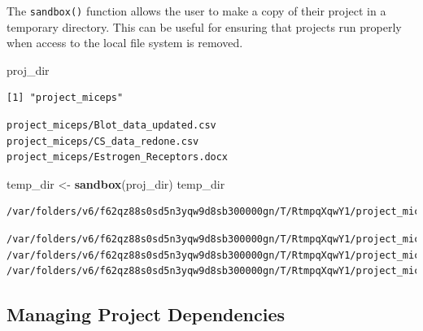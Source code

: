 \documentclass[12pt,twoside]{reedthesis}
\newenvironment{Shaded}{\begin{snugshade}}{\end{snugshade}}
\newcommand{\KeywordTok}[1]{\textcolor[rgb]{0.13,0.29,0.53}{\textbf{#1}}}
\newcommand{\DecValTok}[1]{\textcolor[rgb]{0.00,0.00,0.81}{#1}}
\newcommand{\StringTok}[1]{\textcolor[rgb]{0.31,0.60,0.02}{#1}}
\newcommand{\OperatorTok}[1]{\textcolor[rgb]{0.81,0.36,0.00}{\textbf{#1}}}
\newcommand{\NormalTok}[1]{#1}
\begin{document}
The \texttt{sandbox()} function allows the user to make a copy of their
project in a temporary directory. This can be useful for ensuring that
projects run properly when access to the local file system is removed.
\begin{Shaded}
\begin{Highlighting}[]
\NormalTok{proj_dir}
\end{Highlighting}
\end{Shaded}
\begin{verbatim}
[1] "project_miceps"
\end{verbatim}
\begin{Shaded}
\end{Shaded}
\begin{verbatim}
project_miceps/Blot_data_updated.csv
project_miceps/CS_data_redone.csv
project_miceps/Estrogen_Receptors.docx
\end{verbatim}
\begin{Shaded}
\begin{Highlighting}[]
\NormalTok{temp_dir <-}\StringTok{ }\KeywordTok{sandbox}\NormalTok{(proj_dir)}
\NormalTok{temp_dir}
\end{Highlighting}
\end{Shaded}
\begin{verbatim}
/var/folders/v6/f62qz88s0sd5n3yqw9d8sb300000gn/T/RtmpqXqwY1/project_miceps
\end{verbatim}
\begin{Shaded}
\end{Shaded}
\begin{verbatim}
/var/folders/v6/f62qz88s0sd5n3yqw9d8sb300000gn/T/RtmpqXqwY1/project_miceps/Blot_data_updated.csv
/var/folders/v6/f62qz88s0sd5n3yqw9d8sb300000gn/T/RtmpqXqwY1/project_miceps/CS_data_redone.csv
/var/folders/v6/f62qz88s0sd5n3yqw9d8sb300000gn/T/RtmpqXqwY1/project_miceps/Estrogen_Receptors.docx
\end{verbatim}
\subsection{Managing Project
Dependencies}\label{managing-project-dependencies}
\end{document}
